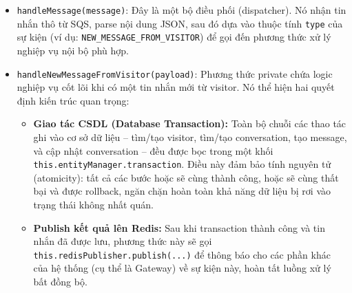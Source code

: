 \begin{itemize}
    \item \texttt{handleMessage(message)}: Đây là một bộ điều phối (dispatcher). Nó nhận tin nhắn thô từ SQS, parse nội dung JSON, sau đó dựa vào thuộc tính \texttt{type} của sự kiện (ví dụ: \texttt{NEW\_MESSAGE\_FROM\_VISITOR}) để gọi đến phương thức xử lý nghiệp vụ nội bộ phù hợp.
    
    \item \texttt{handleNewMessageFromVisitor(payload)}: Phương thức private chứa logic nghiệp vụ cốt lõi khi có một tin nhắn mới từ visitor. Nó thể hiện hai quyết định kiến trúc quan trọng:
    \begin{itemize}
        \item \textbf{Giao tác CSDL (Database Transaction):} Toàn bộ chuỗi các thao tác ghi vào cơ sở dữ liệu -- tìm/tạo visitor, tìm/tạo conversation, tạo message, và cập nhật conversation -- đều được bọc trong một khối \texttt{this.entityManager.transaction}. Điều này đảm bảo tính nguyên tử (atomicity): tất cả các bước hoặc sẽ cùng thành công, hoặc sẽ cùng thất bại và được rollback, ngăn chặn hoàn toàn khả năng dữ liệu bị rơi vào trạng thái không nhất quán.
        \item \textbf{Publish kết quả lên Redis:} Sau khi transaction thành công và tin nhắn đã được lưu, phương thức này sẽ gọi \texttt{this.redisPublisher.publish(...)} để thông báo cho các phần khác của hệ thống (cụ thể là Gateway) về sự kiện này, hoàn tất luồng xử lý bất đồng bộ.
    \end{itemize}
\end{itemize}